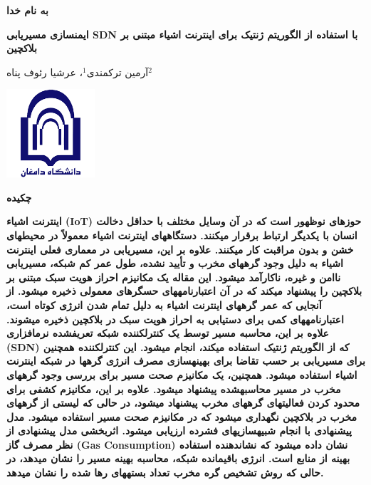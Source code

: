 \documentclass{article} %
\begin{document}


\noindent 

\noindent 

\noindent 

\noindent 

\noindent \textbf{به نام خدا}

\noindent \textbf{ایمنسازی مسیریابی SDN با استفاده از الگوریتم ژنتیک برای اینترنت اشیاء مبتنی بر بلاکچین}

\noindent آرمین ترکمندی${}^{1}$، عرشیا رئوف پناه${}^{2}$ 


\noindent \includegraphics*[width=1.29in, height=1.29in]{image1}

\noindent \textbf{چكيده}

\noindent \textbf{اینترنت اشیاء (IoT) حوزهای نوظهور است که در آن وسایل مختلف با حداقل دخالت انسان با یکدیگر ارتباط برقرار میکنند. دستگاههای اینترنت اشیاء معمولاً در محیطهای خشن و بدون مراقبت کار میکنند. علاوه بر این، مسیریابی در معماری فعلی اینترنت اشیاء به دلیل وجود گرههای مخرب و تأیید نشده، طول عمر کم شبکه، مسیریابی ناامن و غیره، ناکارآمد میشود. این مقاله یک مکانیزم احراز هویت سبک مبتنی بر بلاکچین را پیشنهاد میکند که در آن اعتبارنامههای حسگرهای معمولی ذخیره میشود. از آنجایی که عمر گرههای اینترنت اشیاء به دلیل تمام شدن انرژی کوتاه است، اعتبارنامههای کمی برای دستیابی به احراز هویت سبک در بلاکچین ذخیره میشوند. علاوه بر این، محاسبه مسیر توسط یک کنترلکننده شبکه تعریفشده نرمافزاری (SDN) که از الگوریتم ژنتیک استفاده میکند، انجام میشود. این کنترلکننده همچنین برای مسیریابی بر حسب تقاضا برای بهینهسازی مصرف انرژی گرهها در شبکه اینترنت اشیاء استفاده میشود. همچنین، یک مکانیزم صحت مسیر برای بررسی وجود گرههای مخرب در مسیر محاسبهشده پیشنهاد میشود. علاوه بر این، مکانیزم کشفی برای محدود کردن فعالیتهای گرههای مخرب پیشنهاد میشود، در حالی که لیستی از گرههای مخرب در بلاکچین نگهداری میشود که در مکانیزم صحت مسیر استفاده میشود. مدل پیشنهادی با انجام شبیهسازیهای فشرده ارزیابی میشود. اثربخشی مدل پیشنهادی از نظر مصرف گاز (Gas Consumption) نشان داده میشود که نشاندهنده استفاده بهینه از منابع است. انرژی باقیمانده شبکه، محاسبه بهینه مسیر را نشان میدهد، در حالی که روش تشخیص گره مخرب تعداد بستههای رها شده را نشان میدهد.}
\end{document}
